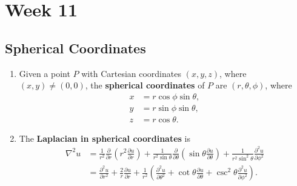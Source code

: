 \chapter{Week 11}
\setcounter{weekpage}{1}
\thispagestyle{plainweek}

\section{Spherical Coordinates}

\begin{enumerate}



\item Given a point $P$ with Cartesian coordinates $(x,y,z)$, where $ (x,y) \neq (0,0)$, the \textbf{spherical coordinates} of $P$ are $(r, \theta, \phi)$, where
    \begin{align*}
        x & = r \cos \phi \sin \theta, \\
        y & = r \sin \phi \sin \theta, \\
        z & = r \cos \theta.
    \end{align*}


\item The \textbf{Laplacian in spherical coordinates} is
    \[
    \begin{aligned}\nabla^{2} u & = \frac{1}{r^{2}}\frac{\partial}{\partial r}\left( r^{2} \frac{\partial u}{\partial r} \right) + \frac{1}{r^{2}\sin \theta} \frac{\partial}{\partial \theta}\left( \sin\theta \frac{\partial u}{\partial \theta} \right) + \frac{1}{r^{2}\sin^{2}\theta} \frac{\partial^{2} u}{\partial \phi^{2}} \\
    & = \frac{\partial^{2} u}{\partial r^{2}} + \frac{2}{r}\frac{\partial u}{\partial r} + \frac{1}{r^{2}}\left( \frac{\partial^{2} u}{\partial \theta^{2}} + \cot \theta \frac{\partial u}{\partial \theta} + \csc^{2}\theta \frac{\partial^{2}u}{\partial \phi^{2}} \right).
    \end{aligned}
    \]



\end{enumerate}
